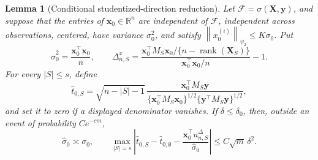 \documentclass[a4paper,11pt,english]{article}
\newtheorem{lemma}[theorem]{Lemma}
\newcommand{\norm}[1]{\left\lVert #1\right\rVert}
\newcommand{\R}{\mathbb R}
\begin{document}
\begin{lemma}[Conditional studentized-direction reduction]
\label{lem:conditional-studentized-direction}
Let $\mathcal F=\sigma(\mathbf X,\mathbf y)$, and suppose that the entries
of $\mathbf x_0\in\R^n$ are independent of $\mathcal F$, independent
across observations, centered, have variance $\sigma_0^2$, and satisfy
$\norm{x_0^{(i)}}_{\psi_2}\le K\sigma_0$.  Put
\begin{equation}\label{eq:conditional-treatment-scale}
        \hat\sigma_0^2=\frac{\mathbf x_0^\top\mathbf x_0}{n},
        \qquad
        \Delta^x_{n,S}
        =\frac{\mathbf x_0^\top M_S\mathbf x_0/
        \{n-\operatorname{rank}(\mathbf X_S)\}}
        {\mathbf x_0^\top\mathbf x_0/n}-1.
\end{equation}
For every $|S|\le s$, define
\begin{equation}\label{eq:conditional-studentized-statistic}
 \hat t_{0,S}
 =\sqrt{n-|S|-1}\,
 \frac{\mathbf x_0^\top M_S\mathbf y}
 {\{\mathbf x_0^\top M_S\mathbf x_0\}^{1/2}
  \{\mathbf y^\top M_S\mathbf y\}^{1/2}},
\end{equation}
and set it to zero if a displayed denominator vanishes.  If
$\delta\le\delta_0$, then, outside an event of probability $Ce^{-cm}$,
\begin{equation}\label{eq:conditional-studentized-direction-reduction}
 \hat\sigma_0\asymp\sigma_0,
 \qquad
 \max_{|S|=s}\left|
 \hat t_{0,S}-\hat t_{0,\emptyset}
 -\frac{\mathbf x_0^\top u_{n,S}^{\Delta}}{\hat\sigma_0}
 \right|
 \le C\sqrt m\,\delta^2.
\end{equation}
\end{lemma}
\end{document}

